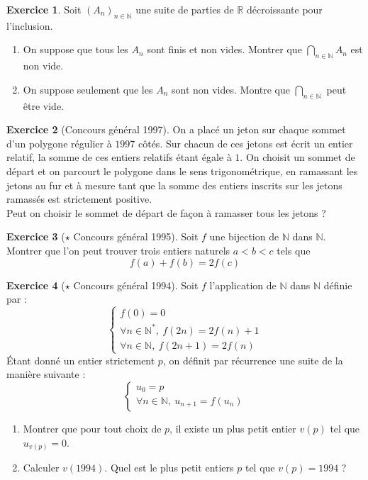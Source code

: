 \documentclass[french]{book}
\newcommand{\N}{\mathbb{N}}
\newcommand{\R}{\mathbb{R}}
\newcommand{\st}{^*}
\theoremstyle{definition}
\newtheorem{ex}{Exercice}[chapter]
\theoremstyle{theorem}
\theoremstyle{remark}
\begin{document}
\begin{ex}
	Soit $(A_n)_{n\in\N}$ une suite de parties de $\R$ décroissante pour l'inclusion.
	\begin{enumerate}
		\item On suppose que tous les $A_n$ sont finis et non vides. Montrer que $\displaystyle\bigcap_{n\in\N}A_n$ est non vide.
		\item On suppose seulement que les $A_n$ sont non vides. Montre que $\displaystyle\bigcap_{n\in\N}$ peut être vide.
	\end{enumerate}
\end{ex}

\begin{ex}[Concours général 1997]
	On a placé un jeton sur chaque sommet d'un polygone régulier à $1997$ côtés. Sur chacun de ces jetons est écrit un entier relatif, la somme de ces entiers relatifs étant égale à $1$. On choisit un sommet de départ et on parcourt le polygone dans le sens trigonométrique, en ramassant les jetons au fur et à mesure tant que la somme des entiers inscrits sur les jetons ramassés est strictement positive. \\ Peut on choisir le sommet de départ de façon à ramasser tous les jetons ?
\end{ex}

\begin{ex}[$\star$ Concours général 1995]
	Soit $f$ une bijection de $\N$ dans $\N$. Montrer que l'on peut trouver trois entiers naturels $a<b<c$ tels  que $$f(a)+f(b)=2f(c)$$
\end{ex}

\begin{ex}[$\star$ Concours général 1994]
	Soit $f$ l'application de $\N$ dans $\N$ définie par : $$\begin{cases}
		f(0)=0 \\
		\forall n\in\N\st,\ f(2n)=2f(n)+1\\
		\forall n\in\N,\ f(2n+1)=2f(n)
	\end{cases}$$ Étant donné un entier strictement $p$, on définit par récurrence une suite de la manière suivante : $$\begin{cases}
	u_0=p \\
	\forall n\in\N,\ u_{n+1}=f(u_n)
	\end{cases}$$
	\begin{enumerate}
		\item Montrer que pour tout choix de $p$, il existe un plus petit entier $v(p)$ tel que $u_{v(p)}=0$.
		\item Calculer $v(1994)$. Quel est le plus petit entiers $p$ tel que $v(p)=1994$ ?
	\end{enumerate}
\end{ex}
\end{document}

